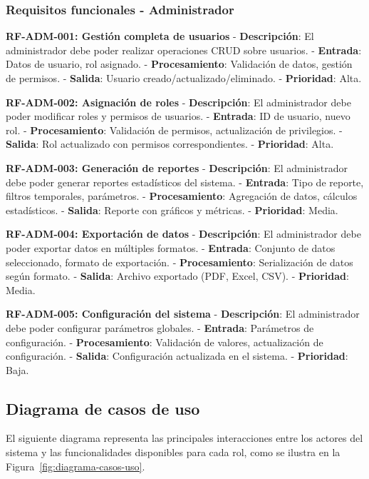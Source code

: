 \documentclass[12pt,a4paper,oneside]{report}
\begin{document}
\subsubsection{Requisitos funcionales -
Administrador}\label{requisitos-funcionales---administrador}

\textbf{RF-ADM-001: Gestión completa de usuarios} -
\textbf{Descripción}: El administrador debe poder realizar operaciones
CRUD sobre usuarios. - \textbf{Entrada}: Datos de usuario, rol asignado.
- \textbf{Procesamiento}: Validación de datos, gestión de permisos. -
\textbf{Salida}: Usuario creado/actualizado/eliminado. -
\textbf{Prioridad}: Alta.

\textbf{RF-ADM-002: Asignación de roles} - \textbf{Descripción}: El
administrador debe poder modificar roles y permisos de usuarios. -
\textbf{Entrada}: ID de usuario, nuevo rol. - \textbf{Procesamiento}:
Validación de permisos, actualización de privilegios. - \textbf{Salida}:
Rol actualizado con permisos correspondientes. - \textbf{Prioridad}:
Alta.

\textbf{RF-ADM-003: Generación de reportes} - \textbf{Descripción}: El
administrador debe poder generar reportes estadísticos del sistema. -
\textbf{Entrada}: Tipo de reporte, filtros temporales, parámetros. -
\textbf{Procesamiento}: Agregación de datos, cálculos estadísticos. -
\textbf{Salida}: Reporte con gráficos y métricas. - \textbf{Prioridad}:
Media.

\textbf{RF-ADM-004: Exportación de datos} - \textbf{Descripción}: El
administrador debe poder exportar datos en múltiples formatos. -
\textbf{Entrada}: Conjunto de datos seleccionado, formato de
exportación. - \textbf{Procesamiento}: Serialización de datos según
formato. - \textbf{Salida}: Archivo exportado (PDF, Excel, CSV). -
\textbf{Prioridad}: Media.

\textbf{RF-ADM-005: Configuración del sistema} - \textbf{Descripción}:
El administrador debe poder configurar parámetros globales. -
\textbf{Entrada}: Parámetros de configuración. - \textbf{Procesamiento}:
Validación de valores, actualización de configuración. -
\textbf{Salida}: Configuración actualizada en el sistema. -
\textbf{Prioridad}: Baja.

\subsection{Diagrama de casos de uso}\label{diagrama-de-casos-de-uso}

El siguiente diagrama representa las principales interacciones entre los
actores del sistema y las funcionalidades disponibles para cada rol, como se ilustra en la Figura~\ref{fig:diagrama-casos-uso}.
\end{document}
